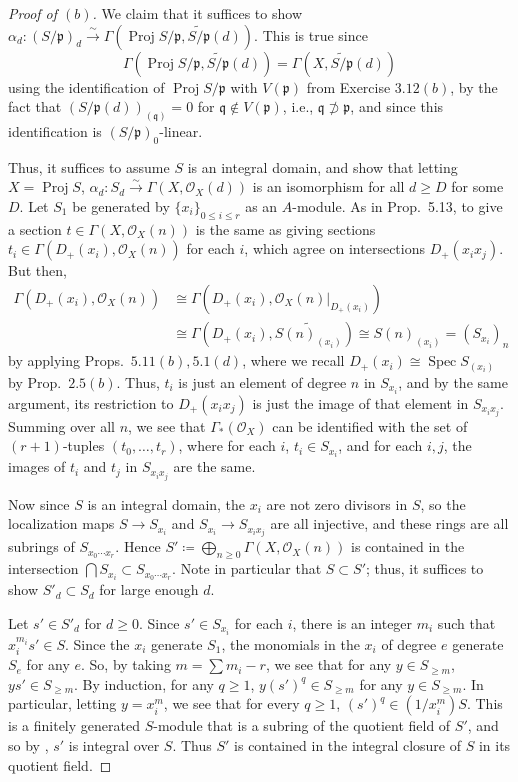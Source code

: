 \documentclass[10pt]{article}
\theoremstyle{definition}
\theoremstyle{remark}
\numberwithin{equation}{section}
\numberwithin{figure}{subsubsection}
\DeclareMathOperator{\Spec}{Spec}
\DeclareMathOperator{\Proj}{Proj}
\newcommand{\OO}{\mathcal{O}}
\newcommand{\isoto}{\overset{\sim}{\to}}
\begin{document}
\begin{proof}[Proof of $(b)$]
  \par We claim that it suffices to show $\alpha_d\colon(S/\mathfrak{p})_{d}
  \isoto \Gamma(\Proj S/\mathfrak{p},\widetilde{S/\mathfrak{p}}(d))$. This is
  true since \[\Gamma(\Proj S/\mathfrak{p},\widetilde{S/\mathfrak{p}}(d)) =
  \Gamma(X,\widetilde{S/\mathfrak{p}}(d))\] using the identification of $\Proj
  S/\mathfrak{p}$ with $V(\mathfrak{p})$ from Exercise $3.12(b)$, by the fact that $(S/\mathfrak{p}(d))_{(\mathfrak{q})} = 0$ for $\mathfrak{q} \notin V(\mathfrak{p})$, i.e., $\mathfrak{q} \not\supset \mathfrak{p}$, and since this identification is $(S/\mathfrak{p})_0$-linear.
  \par Thus, it suffices to assume $S$ is an integral domain, and show that letting $X = \Proj S$, $\alpha_d\colon S_d \isoto \Gamma(X,\OO_X(d))$ is an isomorphism for all $d \ge D$ for some $D$. Let $S_1$ be generated by $\{x_i\}_{0\le i\le r}$ as an $A$-module. As in Prop.~5.13, to give a section $t \in \Gamma(X,\OO_X(n))$ is the same as giving sections $t_i \in \Gamma(D_+(x_i),\OO_X(n))$ for each $i$, which agree on intersections $D_+(x_ix_j)$. But then,
  \begin{align*}
    \Gamma(D_+(x_i),\OO_X(n)) &\cong \Gamma(D_+(x_i),\OO_X(n)\vert_{D_+(x_i)})\\
    &\cong \Gamma(D_+(x_i),\widetilde{S(n)_{(x_i)}}) \cong S(n)_{(x_i)} = (S_{x_i})_n
  \end{align*}
  by applying Props.~$5.11(b),5.1(d)$, where we recall $D_+(x_i) \cong \Spec S_{(x_i)}$ by Prop.~$2.5(b)$. Thus, $t_i$ is just an element of degree $n$ in $S_{x_i}$, and by the same argument, its restriction to $D_+(x_ix_j)$ is just the image of that element in $S_{x_ix_j}$. Summing over all $n$, we see that $\Gamma_*(\OO_X)$ can be identified with the set of $(r+1)$-tuples $(t_0,\ldots,t_r)$, where for each $i$, $t_i \in S_{x_i}$, and for each $i,j$, the images of $t_i$ and $t_j$ in $S_{x_ix_j}$ are the same.
  \par Now since $S$ is an integral domain, the $x_i$ are not zero divisors in $S$, so the localization maps $S \to S_{x_i}$ and $S_{x_i} \to S_{x_ix_j}$ are all injective, and these rings are all subrings of $S_{x_0\cdots x_r}$. Hence $S' \coloneqq \bigoplus_{n \ge 0}\Gamma(X,\OO_X(n))$ is contained in the intersection $\bigcap S_{x_i} \subset S_{x_0\cdots x_r}$. Note in particular that $S \subset S'$; thus, it suffices to show $S'_d \subset S_d$ for large enough $d$.
  \par Let $s' \in S'_d$ for $d \ge 0$. Since $s' \in S_{x_i}$ for each $i$, there is an integer $m_i$ such that $x_i^{m_i}s' \in S$. Since the $x_i$ generate $S_1$, the monomials in the $x_i$ of degree $e$ generate $S_e$ for any $e$. So, by taking $m = \sum m_i - r$, we see that for any $y \in S_{\ge m}$, $ys' \in S_{\ge m}$. By induction, for any $q \ge 1$, $y(s')^q \in S_{\ge m}$ for any $y \in S_{\ge m}$. In particular, letting $y = x_i^m$, we see that for every $q \ge 1$, $(s')^q \in (1/x_i^m)S$. This is a finitely generated $S$-module that is a subring of the quotient field of $S'$, and so by \cite[Prop.~5.1]{AM69}, $s'$ is integral over $S$. Thus $S'$ is contained in the integral closure of $S$ in its quotient field.

\end{proof}
\end{document}
